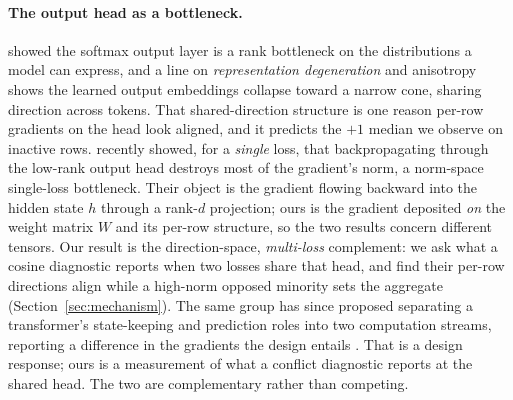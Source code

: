 \paragraph{The output head as a bottleneck.} \citet{yang2018softmax} showed the
softmax output layer is a rank bottleneck on the distributions a model can
express, and a line on \emph{representation degeneration} and anisotropy
\citep{gao2019degeneration} shows the learned output embeddings collapse toward a
narrow cone, sharing direction across tokens. That shared-direction structure is
one reason per-row gradients on the head look aligned, and it predicts the $+1$
median we observe on inactive rows. \citet{godey2026lmhead} recently showed, for
a \emph{single} loss, that backpropagating through the low-rank output head
destroys most of the gradient's norm, a norm-space single-loss bottleneck. Their
object is the gradient flowing backward into the hidden state $h$ through a
rank-$d$ projection; ours is the gradient deposited \emph{on} the weight matrix
$W$ and its per-row structure, so the two results concern different tensors. Our
result is the direction-space, \emph{multi-loss} complement: we ask what a cosine
diagnostic reports when two losses share that head, and find their per-row
directions align while a high-norm opposed minority sets the aggregate
(Section~\ref{sec:mechanism}). The same group has since proposed separating a
transformer's state-keeping and prediction roles into two computation streams,
reporting a difference in the gradients the design entails
\citep{monea2026sps}. That is a design response; ours is a measurement of what
a conflict diagnostic reports at the shared head. The two are complementary
rather than competing.

